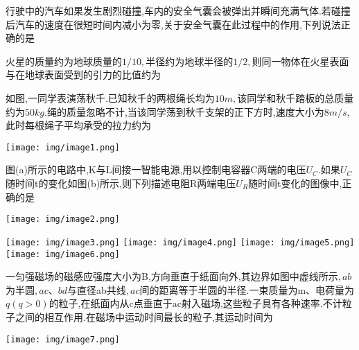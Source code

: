 \question[6]行驶中的汽车如果发生剧烈碰撞,车内的安全气囊会被弹出并瞬间充满气体.若碰撞后汽车的速度在很短时间内减小为零,关于安全气囊在此过程中的作用,下列说法正确的是
\begin{solution}{4cm}

\end{solution}



\question[6]火星的质量约为地球质量的$1/10,$半径约为地球半径的$1/2,$则同一物体在火星表面与在地球表面受到的引力的比值约为
\begin{solution}{4cm}

\end{solution}



\question[6]如图,一同学表演荡秋千.已知秋千的两根绳长均为$10m,$该同学和秋千踏板的总质量约为$50kg.$绳的质量忽略不计,当该同学荡到秋千支架的正下方时,速度大小为$8m/s,$此时每根绳子平均承受的拉力约为
\begin{center}
\texttt{[image: img/image1.png]}
\end{center}

\begin{solution}{4cm}

\end{solution}


\newpage
\question[6]图(a)所示的电路中,K与L间接一智能电源,用以控制电容器C两端的电压$U_C.$如果$U_C$随时间t的变化如图(b)所示,则下列描述电阻R两端电压$U_R$随时间t变化的图像中,正确的是
\begin{center}
\texttt{[image: img/image2.png]}
\end{center}
\texttt{[image: img/image3.png]}
\texttt{[image: img/image4.png]}
\texttt{[image: img/image5.png]}
\texttt{[image: img/image6.png]}

\begin{solution}{4cm}

\end{solution}



\question[6]一匀强磁场的磁感应强度大小为B,方向垂直于纸面向外,其边界如图中虚线所示$,ab$为半圆$,ac、bd$与直径ab共线$,ac$间的距离等于半圆的半径.一束质量为m、电荷量为$q(q>0)$的粒子,在纸面内从c点垂直于ac射入磁场,这些粒子具有各种速率.不计粒子之间的相互作用.在磁场中运动时间最长的粒子,其运动时间为
\begin{center}
\texttt{[image: img/image7.png]}
\end{center}

